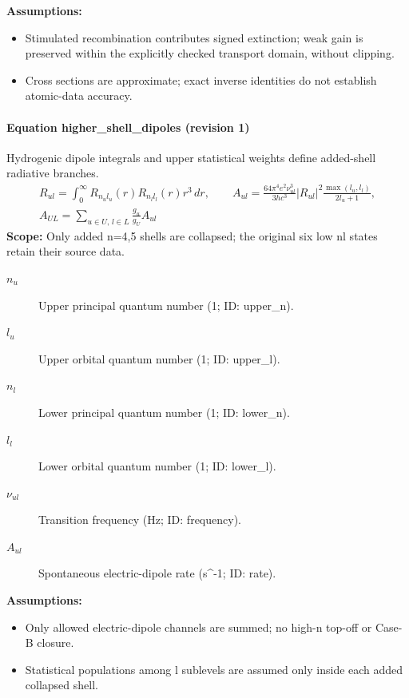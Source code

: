 \noindent\textbf{Assumptions:}
\begin{itemize}
\item Stimulated recombination contributes signed extinction; weak gain is preserved within the explicitly checked transport domain, without clipping.
\item Cross sections are approximate; exact inverse identities do not establish atomic-data accuracy.
\end{itemize}

\paragraph{Equation higher\_shell\_dipoles (revision 1)}
Hydrogenic dipole integrals and upper statistical weights define added-shell radiative branches.
\begin{equation}
\begin{aligned}
R_{ul}=\int_0^\infty R_{n_ul_u}(r)R_{n_ll_l}(r)r^3\,dr,\qquad A_{ul}=\frac{64\pi^4e^2\nu_{ul}^3}{3hc^3}|R_{ul}|^2\frac{\max(l_u,l_l)}{2l_u+1},\\A_{UL}=\sum_{u\in U,\,l\in L}\frac{g_u}{g_U}A_{ul}
\end{aligned}
\label{eq:escape.coupled_5f_hydrogen:higher_5f_shell_5f_dipoles:1}
\end{equation}
\noindent\textbf{Scope:} Only added n=4,5 shells are collapsed; the original six low nl states retain their source data.

\begin{description}
\item[$n_u$] Upper principal quantum number (1; ID: upper\_n).
\item[$l_u$] Upper orbital quantum number (1; ID: upper\_l).
\item[$n_l$] Lower principal quantum number (1; ID: lower\_n).
\item[$l_l$] Lower orbital quantum number (1; ID: lower\_l).
\item[$\nu_{ul}$] Transition frequency (Hz; ID: frequency).
\item[$A_{ul}$] Spontaneous electric-dipole rate (s\textasciicircum{}-1; ID: rate).
\end{description}

\noindent\textbf{Assumptions:}
\begin{itemize}
\item Only allowed electric-dipole channels are summed; no high-n top-off or Case-B closure.
\item Statistical populations among l sublevels are assumed only inside each added collapsed shell.
\end{itemize}

